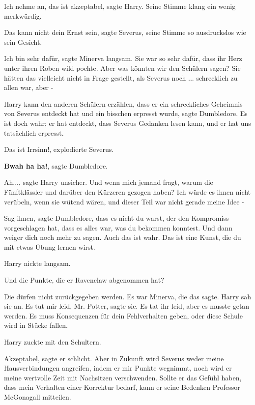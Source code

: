 \glqq{}Ich nehme an, das ist akzeptabel\grqq{}, sagte Harry. Seine Stimme klang
ein wenig merkwürdig.

\glqq{}Das kann nicht dein Ernst sein\grqq{}, sagte Severus, seine Stimme so
ausdruckslos wie sein Gesicht.

\glqq{}Ich bin sehr dafür\grqq{}, sagte Minerva langsam. Sie war so sehr dafür,
dass ihr Herz unter ihren Roben wild pochte. \glqq{}Aber was könnten wir den
Schülern sagen? Sie hätten das vielleicht nicht in Frage gestellt, als Severus
noch ... schrecklich zu allen war, aber -\grqq{}

\glqq{}Harry kann den anderen Schülern erzählen, dass er ein schreckliches
Geheimnis von Severus entdeckt hat und ein bisschen erpresst wurde\grqq{}, sagte
Dumbledore. \glqq{}Es ist doch wahr; er hat entdeckt, dass Severus Gedanken lesen
kann, und er hat uns tatsächlich erpresst.\grqq{}

\glqq{}Das ist Irrsinn!\grqq{}, explodierte Severus.

\glqq{}\textbf{Bwah ha ha!}\grqq{}, sagte Dumbledore.

\glqq{}Ah...\grqq{}, sagte Harry unsicher. \glqq{}Und wenn mich jemand fragt,
warum die Fünftklässler und darüber den Kürzeren gezogen haben? Ich würde es
ihnen nicht verübeln, wenn sie wütend wären, und dieser Teil war nicht gerade
meine Idee -\grqq{}

\glqq{}Sag ihnen\grqq{}, sagte Dumbledore, \glqq{}dass es nicht du warst, der den
Kompromiss vorgeschlagen hat, dass es alles war, was du bekommen konntest. Und
dann weiger dich noch mehr zu sagen. Auch das ist wahr. Das ist eine Kunst, die
du mit etwas Übung lernen wirst.\grqq{}

Harry nickte langsam.

\glqq{}Und die Punkte, die er Ravenclaw abgenommen hat?\grqq{}

\glqq{}Die dürfen nicht zurückgegeben werden.\grqq{} Es war Minerva, die das
sagte. Harry sah sie an. \glqq{}Es tut mir leid, Mr. Potter\grqq{}, sagte sie. Es
tat ihr leid, aber es musste getan werden. \glqq{}Es muss Konsequenzen für dein
Fehlverhalten geben, oder diese Schule wird in Stücke fallen.\grqq{}

Harry zuckte mit den Schultern.

\glqq{}Akzeptabel\grqq{}, sagte er schlicht. \glqq{}Aber in Zukunft wird Severus
weder meine Hausverbindungen angreifen, indem er mir Punkte wegnimmt, noch wird
er meine wertvolle Zeit mit Nachsitzen verschwenden. Sollte er das Gefühl haben,
dass mein Verhalten einer Korrektur bedarf, kann er seine Bedenken Professor
McGonagall mitteilen.\grqq{}

